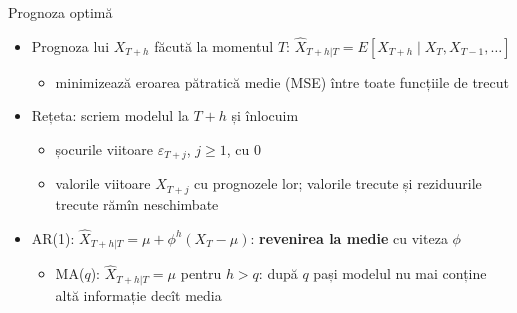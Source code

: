 \begin{frame}{Prognoza optimă}
\itemsize{\small}
\begin{itemize}
    \item Prognoza lui $X_{T+h}$ făcută la momentul $T$: $\hat X_{T+h|T} = E[X_{T+h} \mid X_T, X_{T-1}, \dots]$
    \begin{itemize}
        \item minimizează eroarea pătratică medie (MSE) între toate funcțiile de trecut
    \end{itemize}
    \item Rețeta: scriem modelul la $T + h$ și înlocuim
    \begin{itemize}
        \item șocurile viitoare $\varepsilon_{T+j}$, $j \ge 1$, cu 0
        \item valorile viitoare $X_{T+j}$ cu prognozele lor; valorile trecute și reziduurile trecute rămîn neschimbate
    \end{itemize}
    \item AR(1): $\hat X_{T+h|T} = \mu + \phi^h(X_T - \mu)$: \textbf{revenirea la medie} cu viteza $\phi$
    \begin{itemize}
        \item MA($q$): $\hat X_{T+h|T} = \mu$ pentru $h > q$: după $q$ pași modelul nu mai conține altă informație decît media
    \end{itemize}
\end{itemize}
\end{frame}


